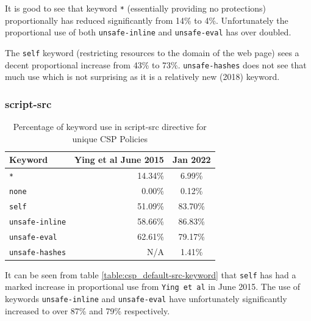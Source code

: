 \documentclass{mscreport}
\begin{document}
\vspace{0.3cm} \noindent
It is good to see that keyword \texttt{*} (essentially providing no protections) proportionally has reduced significantly from 14\% to 4\%. Unfortunately the proportional use of both \texttt{unsafe-inline} and \texttt{unsafe-eval} has over doubled.

\vspace{0.3cm} \noindent
The \texttt{self} keyword (restricting resources to the domain of the web page) sees a decent proportional increase from 43\% to 73\%. \texttt{unsafe-hashes} does not see that much use which is not surprising as it is a relatively new (2018) keyword.


\clearpage
\newpage

\subsubsection{script-src}

\begin{table}[H]
  \begin{center}
    \begin{tabular}{|l|D|c|}  %
      \hline
      \textbf{Keyword} & \textbf{Ying et al} \cite{Ying2016-ag} June 2015 & Jan 2022 \\
      \hline
      \texttt{*} & 14.34\% & 6.99\%\\
      \hline
      \texttt{none} & 0.00\% & 0.12\%\\
      \hline
      \texttt{self} & 51.09\% & 83.70\%\\
      \hline
      \texttt{unsafe-inline} & 58.66\% & 86.83\%\\
      \hline
      \texttt{unsafe-eval} & 62.61\% & 79.17\%\\
      \hline
      \texttt{unsafe-hashes} & N/A & 1.41\%\\
      \hline
    \end{tabular}
    \caption{Percentage of keyword use in script-src directive for unique CSP Policies}
    \label{table:csp_script-src-keyword}  %
  \end{center}
\end{table}

\noindent
It can be seen from table \ref{table:csp_default-src-keyword} that \texttt{self} has had a marked increase in proportional use from \texttt{Ying et al} \cite{Ying2016-ag} in June 2015. The use of keywords \texttt{unsafe-inline} and \texttt{unsafe-eval} have unfortunately significantly increased to over 87\% and 79\% respectively.
\end{document}

